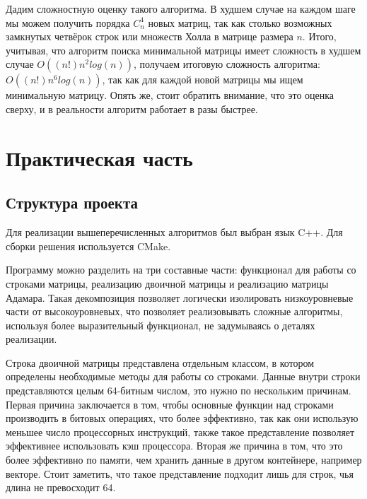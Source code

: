 Дадим сложностную оценку такого алгоритма. В худшем случае на каждом шаге мы можем получить порядка $C_n^4$ новых матриц, так как столько возможных замкнутых четвёрок строк или множеств Холла в матрице размера $n$. Итого, учитывая, что алгоритм поиска минимальной матрицы имеет сложность в худшем случае $O((n!)n^2log(n))$, получаем итоговую сложность алгоритма: $O((n!)n^6log(n))$, так как для каждой новой матрицы мы ищем минимальную матрицу. Опять же, стоит обратить внимание, что это оценка сверху, и в реальности алгоритм работает в разы быстрее.

\chapter{Практическая часть}



\section{Структура проекта}

Для реализации вышеперечисленных алгоритмов был выбран язык C++. Для сборки решения используется CMake.

Программу можно разделить на три составные части: функционал для работы со строками матрицы, реализацию двоичной матрицы и реализацию матрицы Адамара. Такая декомпозиция позволяет логически изолировать низкоуровневые части от высокоуровневых, что позволяет реализовывать сложные алгоритмы, используя более выразительный функционал, не задумываясь о деталях реализации.

Строка двоичной матрицы представлена отдельным классом, в котором определены необходимые методы для работы со строками. Данные внутри строки представляются целым 64-битным числом, это нужно по нескольким причинам. Первая причина заключается в том, чтобы основные функции над строками производить в битовых операциях, что более эффективно, так как они использую меньшее число процессорных инструкций, также такое представление позволяет эффективнее использовать кэш процессора. Вторая же причина в том, что это более эффективно по памяти, чем хранить данные в другом контейнере, например векторе. Стоит заметить, что такое представление подходит лишь для строк, чья длина не превосходит 64.

